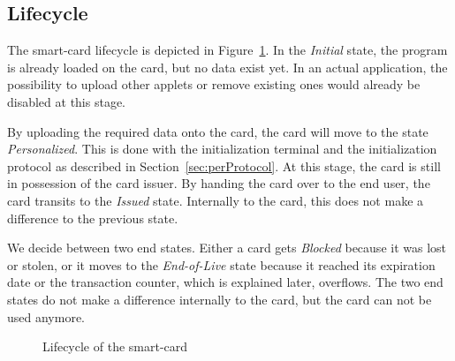 \subsection{Lifecycle}
The smart-card lifecycle is depicted in Figure~\ref{fig:lifecycle}.
In the \emph{Initial} state, the program is already loaded on the card, but no data exist yet.
In an actual application, the possibility to upload other applets or remove existing ones would already be disabled at this stage.

By uploading the required data onto the card, the card will move to the state \emph{Personalized}.
This is done with the initialization terminal and the initialization protocol as described in Section~\ref{sec:perProtocol}.
At this stage, the card is still in possession of the card issuer.
By handing the card over to the end user, the card transits to the \emph{Issued} state.
Internally to the card, this does not make a difference to the previous state.

We decide between two end states.
Either a card gets \emph{Blocked} because it was lost or stolen, or it moves to the \emph{End-of-Live} state because it reached its expiration date or the transaction counter, which is explained later, overflows.
The two end states do not make a difference internally to the card, but the card can not be used anymore.

\begin{figure}
    \centering
    
    \caption{Lifecycle of the smart-card}
    \label{fig:lifecycle}
\end{figure}


